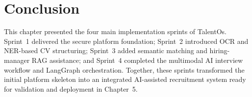 \section*{Conclusion}
This chapter presented the four main implementation sprints of TalentOs. Sprint~1 delivered the secure platform foundation; Sprint~2 introduced OCR and NER-based CV structuring; Sprint~3 added semantic matching and hiring-manager RAG assistance; and Sprint~4 completed the multimodal AI interview workflow and LangGraph orchestration. Together, these sprints transformed the initial platform skeleton into an integrated AI-assisted recruitment system ready for validation and deployment in Chapter~5.
